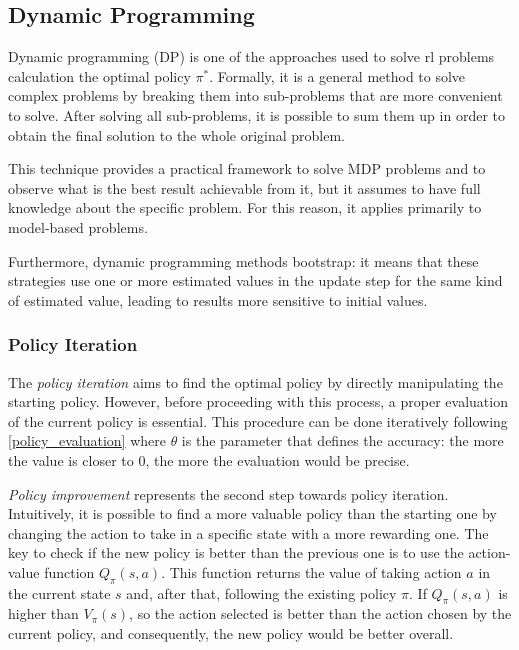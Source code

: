 
\subsection{Dynamic Programming}

Dynamic programming (DP) \cite[Chapter 4]{sutton2018reinforcement} is one of the approaches used to solve \acrshort{rl} problems calculation the optimal policy $\pi^*$. Formally, it is a general method to solve complex problems by breaking them into sub-problems that are more convenient to solve. After solving all sub-problems, it is possible to sum them up in order to obtain the final solution to the whole original problem.

This technique provides a practical framework to solve MDP problems and to observe what is the best result achievable from it, but it assumes to have full knowledge about the specific problem. For this reason, it applies primarily to model-based problems.

Furthermore, dynamic programming methods bootstrap: it means that these strategies use one or more estimated values in the update step for the same kind of estimated value, leading to results more sensitive to initial values.

\subsubsection{Policy Iteration}

The \textit{policy iteration} aims to find the optimal policy by directly manipulating the starting policy. However, before proceeding with this process, a proper evaluation of the current policy is essential. This procedure can be done iteratively following \vref{policy_evaluation} where $\theta$ is the parameter that defines the accuracy: the more the value is closer to $0$, the more the evaluation would be precise.

\textit{Policy improvement} represents the second step towards policy iteration. Intuitively, it is possible to find a more valuable policy than the starting one by changing the action to take in a specific state with a more rewarding one.  The key to check if the new policy is better than the previous one is to use the action-value function $Q_\pi(s,a)$. This function returns the value of taking action $a$ in the current state $s$ and, after that, following the existing policy $\pi$. If $Q_\pi(s,a)$ is higher than $V_\pi(s)$, so the action selected is better than the action chosen by the current policy, and consequently, the new policy would be better overall.

